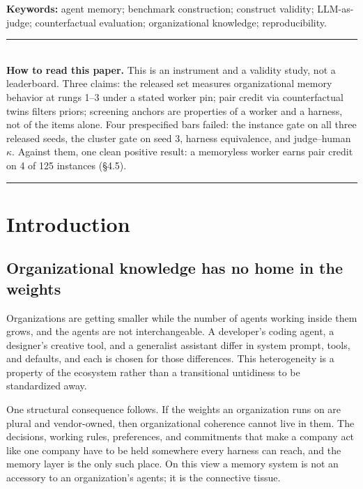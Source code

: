 \documentclass[11pt]{article}
\begin{document}
\begin{center}
\begin{minipage}{0.93\textwidth}
\footnotesize\noindent\textbf{Keywords:} agent memory; benchmark
construction; construct validity; LLM-as-judge; counterfactual evaluation;
organizational knowledge; reproducibility.
\end{minipage}
\end{center}

\begin{center}
\begin{minipage}{0.93\textwidth}
\rule{\textwidth}{0.4pt}\\[0.55em]
\small\noindent\textbf{How to read this paper.} This is an instrument and a
validity study, not a leaderboard. Three claims: the released set measures
organizational memory behavior at rungs 1--3 under a stated worker pin; pair
credit via counterfactual twins filters priors; screening anchors are properties
of a worker and a harness, not of the items alone. Four prespecified bars failed:
the instance gate on all three released seeds, the cluster gate on seed 3,
harness equivalence, and judge--human $\kappa$. Against them, one clean positive
result: a memoryless worker earns pair credit on 4 of 125 instances (\S4.5).
\\[0.55em]\rule{\textwidth}{0.4pt}
\end{minipage}
\end{center}

\section{Introduction}

\subsection{Organizational knowledge has no home in the weights}

Organizations are getting smaller while the number of agents working inside them
grows, and the agents are not interchangeable. A developer's coding agent, a
designer's creative tool, and a generalist assistant differ in system prompt,
tools, and defaults, and each is chosen for those differences. This heterogeneity
is a property of the ecosystem rather than a transitional untidiness to be
standardized away.

One structural consequence follows. If the weights an organization runs on are
plural and vendor-owned, then organizational coherence cannot live in them. The
decisions, working rules, preferences, and commitments that make a company act
like one company have to be held somewhere every harness can reach, and the
memory layer is the only such place. On this view a memory system is not an
accessory to an organization's agents; it is the connective tissue.
\end{document}
